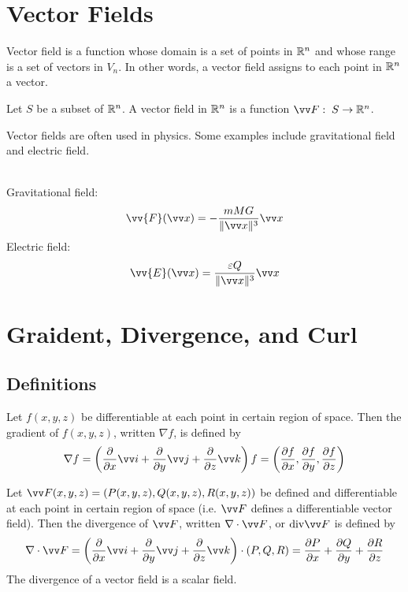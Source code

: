 \section{Vector Fields}
Vector field is a function whose domain is a set of points in ${\mathbb R}^n$ and whose range is a set of vectors in $V_n$. In other words, a vector field assigns to each point in ${\mathbb R}^n$ a vector.

\begin{definition}
Let $S$ be a subset of ${\mathbb R}^n$. A vector field in ${\mathbb R}^n$ is a function $\vv F:\; S \to \R^n$.
\end{definition}

Vector fields are often used in physics. Some examples include gravitational field and electric field.

\begin{example}
\hfill \\
Gravitational field:
$$
\vv{F}(\vv x) = - \frac{mMG}{\norm{\vv x}^3}\vv x
$$
Electric field:
$$
\vv{E}(\vv x) = \frac{\varepsilon Q}{\norm{\vv x}^3}\vv x
$$
\end{example}

\section{Graident, Divergence, and Curl}

\subsection{Definitions}

\begin{definition}[Gradient]
Let $f(x,y,z)$ be differentiable at each point in certain region of space. Then the gradient of $f(x,y,z)$, written $\nabla f$, is defined by
$$
\nabla f = \left( \partialderiv{}{x}\vv i + \partialderiv{}{y}\vv j + \partialderiv{}{z}\vv k \right) f = \left( \partialderiv{f}{x}, \partialderiv{f}{y}, \partialderiv{f}{z} \right)
$$
\end{definition}

\begin{definition}[Divergence]
Let $\vv F (x,y,z) = (P(x,y,z), Q(x,y,z), R(x,y,z))$ be defined and differentiable at each point in certain region of space (i.e. $\vv F$ defines a differentiable vector field). Then the divergence of $\vv F$, written $\nabla \cdot \vv F$, or $\mathrm{div} \vv F$ is defined by
$$
\nabla \cdot \vv F = \left( \partialderiv{}{x}\vv i + \partialderiv{}{y}\vv j + \partialderiv{}{z}\vv k \right) \cdot (P,Q,R) = \partialderiv{P}{x} + \partialderiv{Q}{y} + \partialderiv{R}{z}
$$
The divergence of a vector field is a scalar field.
\end{definition}

